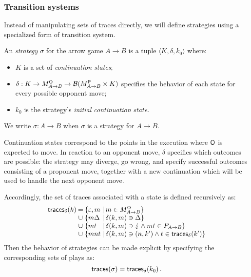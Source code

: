 
\subsubsection{Transition systems} %

Instead of manipulating sets of traces directly,
we will define strategies using a specialized form of transition system.

\begin{definition} %
\label{def:strat}
An \emph{strategy} $\sigma$ for the arrow game $A \rightarrow B$
is a tuple
$\langle K, \delta, k_0 \rangle$
where:
\begin{itemize}
  \item $K$ is a set of \emph{continuation states};
  \item $\delta : K \rightarrow M_{A \rightarrow B}^{ \mathsf{O} } \rightarrow
                  \mathcal{B}(M_{A \rightarrow B}^{ \mathsf{P} } \times K)$
    specifies the behavior of each state
    for every possible opponent move;
  \item $k_0$
    is the strategy's \emph{initial continuation state}.
\end{itemize}
We write $\sigma : A \rightarrow B$ when $\sigma$ is a strategy
for $A \rightarrow B$.
\end{definition}

Continuation states correspond to
the points in the execution where $ \mathsf{O} $ is expected to move.
In reaction to an opponent move,
$\delta$ specifies which outcomes are possible:
the strategy may diverge, go wrong,
and specify successful outcomes
consisting of a proponent move,
together with a new continuation
which will be used to handle the next opponent move.

Accordingly,
the set of traces associated with a state is
defined recursively as:
\[
  \begin{array}{l@{\:}c@{\:\{}l@{\:\mid\:}l}
    \kw{traces}_\delta(k) & = & \varepsilon, m &
      m \in M_{A \rightarrow B}^\kw{O} \} \\
    & \cup & m \Delta &
      \delta(k, m) \ni \Delta \} \\
    & \cup & mt &
      \delta(k, m) \ni \lightning \wedge mt \in P_{A \rightarrow B} \} \\
    & \cup & m n t &
      \delta(k, m) \ni (n, k') \wedge t \in \kw{traces}_\delta(k') \}
  \end{array}
\]
Then the behavior of strategies can be made explicit
by specifying the corresponding sets of plays as:
\[
   \mathsf{traces} (\sigma) =  \mathsf{traces} _\delta(k_0) \,.
\]

